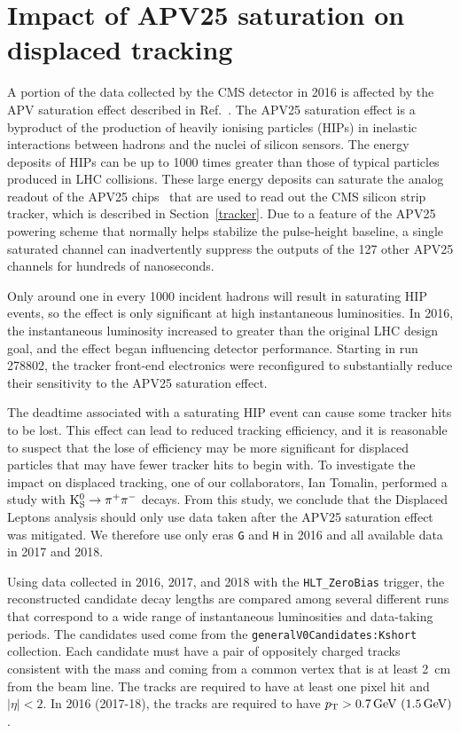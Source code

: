 \chapter{Impact of APV25 saturation on displaced tracking}
\label{k0}
A portion of the data collected by the CMS detector in 2016 is affected by the APV saturation effect described in Ref.~\cite{hip_study}. The APV25 saturation effect is a byproduct of the production of heavily ionising particles (HIPs) in inelastic interactions between hadrons and the nuclei of silicon sensors. The energy deposits of HIPs can be up to 1000 times greater than those of typical particles produced in LHC collisions. These large energy deposits can saturate the analog readout of the APV25 chips~\cite{apv25} that are used to read out the CMS silicon strip tracker, which is described in Section~\ref{tracker}. Due to a feature of the APV25 powering scheme that normally helps stabilize the pulse-height baseline, a single saturated channel can inadvertently suppress the outputs of the 127 other APV25 channels for hundreds of nanoseconds.

Only around one in every 1000 incident hadrons will result in saturating HIP events, so the effect is only significant at high instantaneous luminosities. In 2016, the instantaneous luminosity increased to greater than the original LHC design goal, and the effect began influencing detector performance. Starting in run 278802, the tracker front-end electronics were reconfigured to substantially reduce their sensitivity to the APV25 saturation effect.

The deadtime associated with a saturating HIP event can cause some tracker hits to be lost. This effect can lead to reduced tracking efficiency, and it is reasonable to suspect that the lose of efficiency may be more significant for displaced particles that may have fewer tracker hits to begin with. To investigate the impact on displaced tracking, one of our collaborators, Ian Tomalin, performed a study with $\mathrm{K^0_S}\to\pi^+\pi^-$ decays. From this study, we conclude that the Displaced Leptons analysis should only use data taken after the APV25 saturation effect was mitigated. We therefore use only eras \texttt{G} and \texttt{H} in 2016 and all available data in 2017 and 2018.

Using data collected in 2016, 2017, and 2018 with the \texttt{HLT\_ZeroBias} trigger, the reconstructed \Kzero candidate decay lengths are compared among several different runs that correspond to a wide range of instantaneous luminosities and data-taking periods. The \Kzero candidates used come from the \texttt{generalV0Candidates:Kshort} collection. Each candidate must have a pair of oppositely charged tracks consistent with the \Kzero mass and coming from a common vertex that is at least \SI{2}{\cm} from the beam line. The tracks are required to have at least one pixel hit and $|\eta|<2$. In 2016 (2017-18), the tracks are required to have $\pt>\SI{0.7}{\GeV}\ (\SI{1.5}{\GeV})$.

